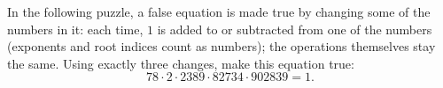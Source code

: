 In the following puzzle, a false equation is made true by changing some of the numbers in it: each time, $1$ is added to or subtracted from one of the numbers (exponents and root indices count as numbers); the operations themselves stay the same. Using exactly three changes, make this equation true:
\[78\cdot2\cdot2389\cdot82734\cdot902839=1.\]
